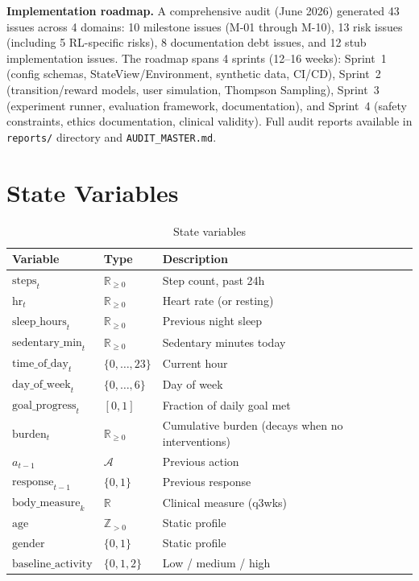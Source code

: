 \documentclass[11pt,a4paper]{article}
\begin{document}
\textbf{Implementation roadmap.} A comprehensive audit (June 2026) generated
43 issues across 4 domains: 10 milestone issues (M-01 through M-10), 13 risk
issues (including 5 RL-specific risks), 8 documentation debt issues, and 12
stub implementation issues. The roadmap spans 4 sprints (12--16 weeks):
Sprint~1 (config schemas, StateView/Environment, synthetic data, CI/CD),
Sprint~2 (transition/reward models, user simulation, Thompson Sampling),
Sprint~3 (experiment runner, evaluation framework, documentation), and
Sprint~4 (safety constraints, ethics documentation, clinical validity). Full
audit reports available in \texttt{reports/} directory and
\texttt{AUDIT\_MASTER.md}.




\appendix
\section{State Variables}
\label{app:state}

\begin{table}[H]
\centering
\caption{State variables}
\begin{tabular}{lll}
\toprule
Variable & Type & Description \\
\midrule
$\text{steps}_t$ & $\mathbb{R}_{\geq 0}$ & Step count, past 24h \\
$\text{hr}_t$ & $\mathbb{R}_{\geq 0}$ & Heart rate (or resting) \\
$\text{sleep\_hours}_t$ & $\mathbb{R}_{\geq 0}$ & Previous night sleep \\
$\text{sedentary\_min}_t$ & $\mathbb{R}_{\geq 0}$ & Sedentary minutes today \\
$\text{time\_of\_day}_t$ & $\{0,\dots,23\}$ & Current hour \\
$\text{day\_of\_week}_t$ & $\{0,\dots,6\}$ & Day of week \\
$\text{goal\_progress}_t$ & $[0,1]$ & Fraction of daily goal met \\
$\text{burden}_t$ & $\mathbb{R}_{\geq 0}$ & Cumulative burden (decays when no interventions) \\
$a_{t-1}$ & $\mathcal{A}$ & Previous action \\
$\text{response}_{t-1}$ & $\{0,1\}$ & Previous response \\
$\text{body\_measure}_k$ & $\mathbb{R}$ & Clinical measure (q3wks) \\
$\text{age}$ & $\mathbb{Z}_{>0}$ & Static profile \\
$\text{gender}$ & $\{0,1\}$ & Static profile \\
$\text{baseline\_activity}$ & $\{0,1,2\}$ & Low / medium / high \\
\bottomrule
\end{tabular}
\end{table}
\end{document}
